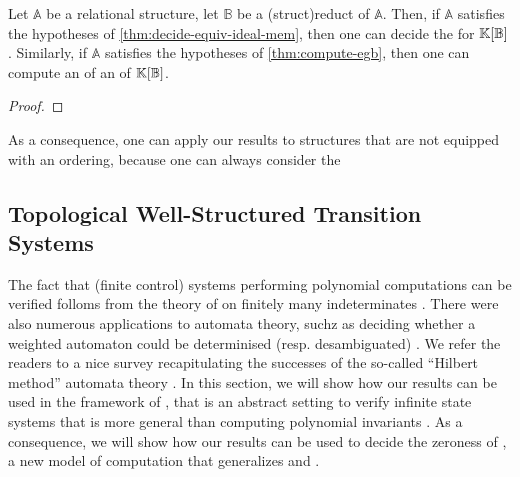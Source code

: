 \begin{lemma}
  \label{lem:reducts-equiv-hilbert}
  Let $\mathbb{A}$ be a relational structure, let $\mathbb{B}$ be a 
  \kl(struct){reduct} of $\mathbb{A}$. Then, if $\mathbb{A}$ satisfies the
  hypotheses of \cref{thm:decide-equiv-ideal-mem},
  then one can decide the  for
  $\mathbb{K}[\mathbb{B}]$. Similarly, 
  if $\mathbb{A}$ satisfies the hypotheses of
  \cref{thm:compute-egb}, then one can compute an
   of an
   of $\mathbb{K}[\mathbb{B}]$.
\end{lemma}
\begin{proof}
\end{proof}

\AP 
As a consequence, one can apply our results to structures that are not equipped 
with an ordering, because one can always consider the 




\subsection{Topological Well-Structured Transition Systems}

The fact that (finite control) systems performing polynomial computations can
be verified folloms from the theory of  on finitely many
indeterminates \cite{MULSEI02,BEDUSHWO17}. There were also numerous
applications to automata theory, suchz as deciding whether a weighted automaton
could be determinised (resp. desambiguated) \cite{BESM23,PUSM24}. We refer the
readers to a nice survey recapitulating the successes of the so-called
``Hilbert method'' automata theory \cite{BOJAN19}. In this section, we will
show how our results can be used in the framework of , that is an abstract setting to verify
infinite state systems that is more general than computing polynomial
invariants \cite{JGL07,JGL10}. As a consequence, we will show how our results
can be used to decide the zeroness of , a
new model of computation that generalizes 
\cite{BEDUSHWO17} and  \cite{BOKLMO21}.

